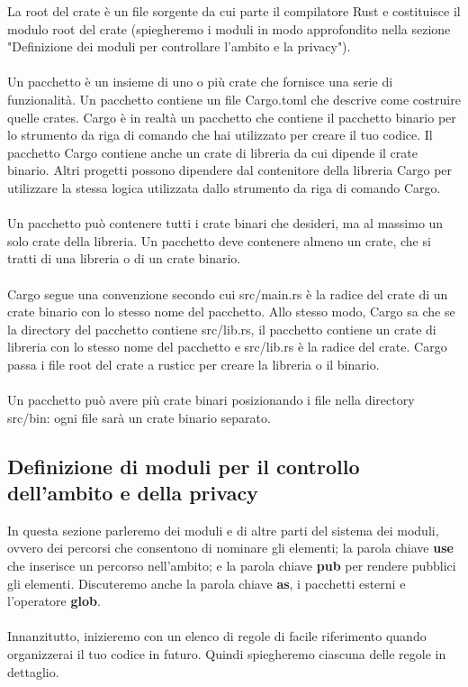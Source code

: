 \documentclass[11pt,a4paper]{article}
\begin{document}
La root del crate è un file sorgente da cui parte il compilatore Rust e costituisce il modulo root del crate (spiegheremo i moduli in modo approfondito nella sezione "Definizione dei moduli per controllare l'ambito e la privacy").\\
\\
Un pacchetto è un insieme di uno o più crate che fornisce una serie di funzionalità. Un pacchetto contiene un file Cargo.toml che descrive come costruire quelle crates. Cargo è in realtà un pacchetto che contiene il pacchetto binario per lo strumento da riga di comando che hai utilizzato per creare il tuo codice. Il pacchetto Cargo contiene anche un crate di libreria da cui dipende il crate binario. Altri progetti possono dipendere dal contenitore della libreria Cargo per utilizzare la stessa logica utilizzata dallo strumento da riga di comando Cargo.\\
\\
Un pacchetto può contenere tutti i crate binari che desideri, ma al massimo un solo crate della libreria. Un pacchetto deve contenere almeno un crate, che si tratti di una libreria o di un crate binario.\\
\\
Cargo segue una convenzione secondo cui src/main.rs è la radice del crate di un crate binario con lo stesso nome del pacchetto. Allo stesso modo, Cargo sa che se la directory del pacchetto contiene src/lib.rs, il pacchetto contiene un crate di libreria con lo stesso nome del pacchetto e src/lib.rs è la radice del crate. Cargo passa i file root del crate a rusticc per creare la libreria o il binario.\\
\\
Un pacchetto può avere più crate binari posizionando i file nella directory src/bin: ogni file sarà un crate binario separato.\\

\subsection{Definizione di moduli per il controllo dell'ambito e della privacy}

In questa sezione parleremo dei moduli e di altre parti del sistema dei moduli, ovvero dei percorsi che consentono di nominare gli elementi; la parola chiave \textbf{use} che inserisce un percorso nell'ambito; e la parola chiave \textbf{pub} per rendere pubblici gli elementi. Discuteremo anche la parola chiave \textbf{as}, i pacchetti esterni e l'operatore \textbf{glob}.\\
\\
Innanzitutto, inizieremo con un elenco di regole di facile riferimento quando organizzerai il tuo codice in futuro. Quindi spiegheremo ciascuna delle regole in dettaglio.
\end{document}
